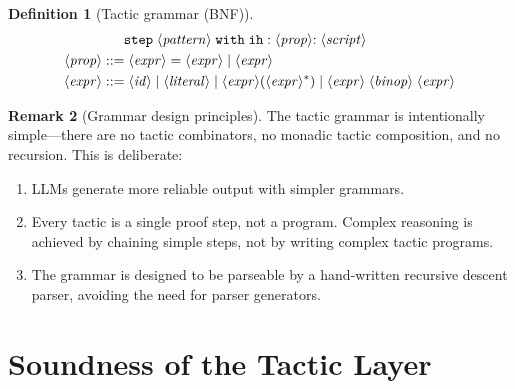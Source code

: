 \documentclass[11pt,a4paper]{report}
\theoremstyle{definition}
\newtheorem{definition}{Definition}[chapter]
\newtheorem{remark}[definition]{Remark}
\theoremstyle{plain}
\begin{document}
\begin{definition}[Tactic grammar (BNF)]
\begin{align}
  &\;\quad\; \mathtt{step} \; \langle\mathit{pattern}\rangle
    \; \mathtt{with} \; \mathtt{ih:} \; \langle\mathit{prop}\rangle \mathtt{:}
    \; \langle\mathit{script}\rangle \notag\\
\langle\mathit{prop}\rangle &::= \langle\mathit{expr}\rangle \; \mathtt{=} \; \langle\mathit{expr}\rangle
  \mid \langle\mathit{expr}\rangle \notag\\
\langle\mathit{expr}\rangle &::= \langle\mathit{id}\rangle \mid \langle\mathit{literal}\rangle
  \mid \langle\mathit{expr}\rangle \mathtt{(} \langle\mathit{expr}\rangle^* \mathtt{)}
  \mid \langle\mathit{expr}\rangle \; \langle\mathit{binop}\rangle \; \langle\mathit{expr}\rangle \notag
\end{align}
\end{definition}

\begin{remark}[Grammar design principles]
The tactic grammar is intentionally simple---there are no tactic combinators,
no monadic tactic composition, and no recursion.  This is deliberate:
\begin{enumerate}
  \item LLMs generate more reliable output with simpler grammars.
  \item Every tactic is a single proof step, not a program.  Complex reasoning
    is achieved by chaining simple steps, not by writing complex tactic programs.
  \item The grammar is designed to be parseable by a hand-written recursive
    descent parser, avoiding the need for parser generators.
\end{enumerate}
\end{remark}


\section{Soundness of the Tactic Layer}
\end{document}

